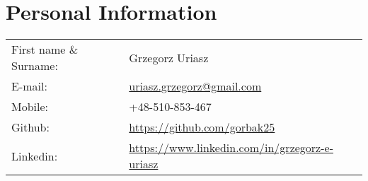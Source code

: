 \section{\sc Personal Information}

\vspace{.05in}
\begin{tabular}{@{}p{1.8in}p{3in}}
First name \& Surname: & Grzegorz Uriasz \\
E-mail: & \href{mailto:uriasz.grzegorz@gmail.com}{uriasz.grzegorz@gmail.com} \\
Mobile: & +48-510-853-467 \\
Github: & \href{https://github.com/gorbak25}{https://github.com/gorbak25} \\
Linkedin: & \href{https://www.linkedin.com/in/grzegorz-e-uriasz}{https://www.linkedin.com/in/grzegorz-e-uriasz} \\
\end{tabular}
\vspace{-0.1in}
